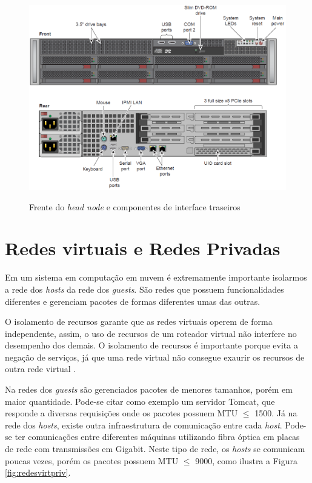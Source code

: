     \begin{figure}[htb]
    \centering
    \includegraphics[scale=0.50]{imagens/headnode.png}
    \caption{Frente do \textit{head node} e componentes de interface traseiros} \cite{SGI2011}
    \label{fig:headnode}
    \end{figure}

\section{Redes virtuais e Redes Privadas}

    Em um sistema em computação em nuvem é extremamente importante isolarmos a rede dos \textit{hosts} da rede dos \textit{guests}. São redes que possuem funcionalidades diferentes e gerenciam pacotes de formas diferentes umas das outras.
    
    O isolamento de recursos garante que as redes virtuais operem de forma independente, assim, o uso de recursos de um roteador virtual não interfere no desempenho dos demais. O isolamento de recursos é importante porque evita a negação de serviços, já que uma rede virtual não consegue exaurir os recursos de outra rede virtual \cite{Carlos2011}.
    
    Na redes dos \textit{guests} são gerenciados pacotes de menores tamanhos, porém em maior quantidade. Pode-se citar como exemplo um servidor Tomcat, que responde a diversas requisições onde os pacotes possuem MTU $\leq$ 1500.
    Já na rede dos \textit{hosts}, existe outra infraestrutura de comunicação entre cada \textit{host}. Pode-se ter comunicações entre diferentes máquinas utilizando fibra óptica em placas de rede com transmissões em Gigabit.
    Neste tipo de rede, os \textit{hosts} se comunicam poucas vezes, porém os pacotes possuem MTU $\leq$ 9000, como ilustra a Figura \ref{fig:redesvirtpriv}.
    
